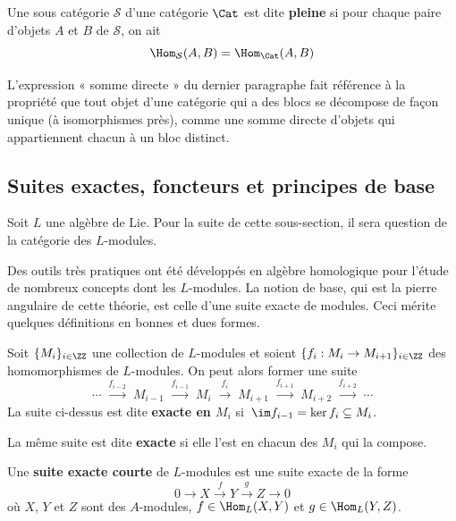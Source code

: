 \begin{Def} Une sous catégorie $\mathcal{S}$ d'une catégorie $\Cat$ est dite \textbf{pleine} si pour chaque paire d'objets $A$ et $B$ de $\mathcal{S}$, on ait
$$ \Hom_\mathcal{S}(A,B) = \Hom_\Cat(A,B) $$
\end{Def}

\begin{Rem} L'expression « somme directe » du dernier paragraphe fait référence à la propriété que tout objet d'une catégorie qui a des blocs se décompose de façon unique (à isomorphismes près), comme une somme directe d'objets qui appartiennent chacun à un bloc distinct. 
\end{Rem}



%
\subsection{Suites exactes, foncteurs et principes de base}

Soit $L$ une algèbre de Lie. Pour la suite de cette sous-section, il sera question de la catégorie des $L$-modules. 

Des outils très pratiques ont été développés en algèbre homologique pour l'étude de nombreux concepts dont les $L$-modules. La notion de base, qui est la pierre angulaire de cette théorie, est celle d'une suite exacte de modules. Ceci mérite quelques définitions en bonnes et dues formes.

\begin{Def} Soit $\{M_i\}_{i \in \ZZ}$ une collection de $L$-modules et soient $\{f_i : M_i \rightarrow M_{i+1}\}_{i \in \ZZ}$ des homomorphismes de $L$-modules. On peut alors former une suite
$$ \cdots \; \stackrel{f_{i-2}}{\longrightarrow} \; M_{i-1} \; \stackrel{f_{i-1}}{\longrightarrow} \; M_i \; \stackrel{f_i}{\longrightarrow} \; M_{i+1} \; \stackrel{f_{i+1}}{\longrightarrow} \; M_{i+2} \; \stackrel{f_{i+2}}{\longrightarrow} \; \cdots $$
La suite ci-dessus est dite \textbf{exacte en $M_i$} si $\, \im f_{i-1} =  \ker f_i \subseteq M_i$.

La même suite est dite \textbf{exacte} si elle l'est en chacun des $M_i$ qui la compose.
\end{Def}

\begin{Def} Une \textbf{suite exacte courte} de $L$-modules est une suite exacte de la forme
$$ 0 \longrightarrow X \stackrel{f}{\longrightarrow} Y \stackrel{g}{\longrightarrow} Z \longrightarrow 0 $$
où $X$, $Y$ et $Z$ sont des $A$-modules, $f \in \Hom_L(X,Y)$ et $g \in \Hom_L(Y,Z)$.
\end{Def}

